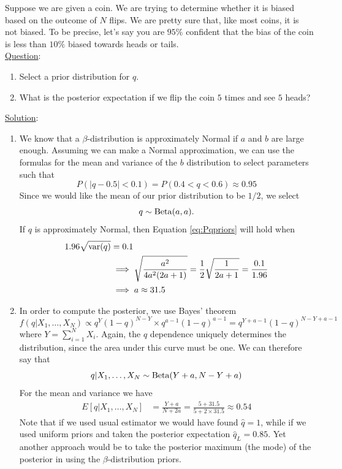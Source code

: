 \begin{example}\label{ex:beta2}
Suppose we are given a coin. We are trying to determine whether it is biased based on the outcome of $N$ flips. We are pretty sure that, like most coins, it is not biased. To be precise, let's say you are $95\%$ confident that the bias of the coin is less than $10\%$ biased towards heads or tails.\\

\noindent 
\underline{Question}: 
\begin{enumerate}[label=(\alph*)]
\item Select a prior distribution for $q$. 
\item What is the posterior expectation if we flip the coin $5$ times and see $5$ heads? \\
\end{enumerate} 


\noindent 
\underline{Solution}: 
\begin{enumerate}[label=(\alph*)]
\item We know that a $\beta$-distribution is approximately Normal if $a$ and $b$ are large enough. Assuming we can make a Normal approximation, we can use the formulas for the mean and variance of the $b$ distribution to select parameters such that 
\begin{equation}\label{eq:Pqpriors}
P(|q-0.5|<0.1)  = P(0.4<q<0.6) \approx 0.95
\end{equation}
Since we would like the mean of our prior distribution to be $1/2$, we select
\begin{equation*}
q \sim {\rm Beta}(a,a).
\end{equation*}
If $q$ is approximately Normal, then Equation \ref{eq:Pqpriors} will hold when 
\begin{align*}
1.96 \sqrt{{\rm var}(q)} &= 0.1 \\
&\implies  \sqrt{\frac{a^2}{4a^2(2a+1)}} = \frac{1}{2}\sqrt{\frac{1}{2a+1}}= \frac{0.1}{1.96}\\
&\implies a \approx 31.5
\end{align*}
\item In order to compute the posterior, we use Bayes' theorem 
\begin{equation*}
f(q|X_1,\dots,X_N) \propto q^{Y}(1-q)^{N-Y} \times q^{a-1}(1-q)^{a-1} = q^{Y+a-1}(1-q)^{N-Y+a-1}
\end{equation*}
where $Y = \sum_{i=1}^NX_i$. 
Again, the $q$ dependence uniquely determines the distribution, since the area under this curve must be one. We can therefore say that 
\begin{equation*}
q|X_1,\dots,X_N \sim {\rm Beta}(Y+a,N-Y+a)
\end{equation*}
For the mean and variance we have
\begin{align*}
E[q|X_1,\dots,X_N] &= \frac{Y+a}{N+2a} =  \frac{5+31.5}{5+2\times 31.5}  \approx 0.54
\end{align*}
Note that if we used usual estimator we would have found $\hat{q} = 1$, while if we used uniform priors and taken the posterior expectation $\hat{q}_L = 0.85$. Yet another approach would be to take the posterior maximum (the mode) of the posterior in using the $\beta$-distribution priors. 


\end{enumerate}
\end{example}
